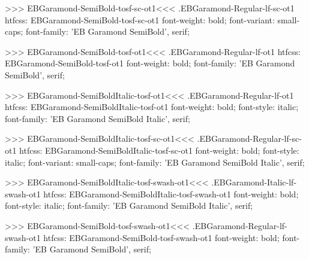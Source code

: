 {{{{{{{>>>
\<EBGaramond-SemiBold-tosf-sc-ot1\><<<
.EBGaramond-Regular-lf-sc-ot1
htfcss:  EBGaramond-SemiBold-tosf-sc-ot1  font-weight: bold; font-variant: small-caps; font-family: 'EB Garamond SemiBold', serif;

>>>
\<EBGaramond-SemiBold-tosf-ot1\><<<
.EBGaramond-Regular-lf-ot1
htfcss:  EBGaramond-SemiBold-tosf-ot1  font-weight: bold; font-family: 'EB Garamond SemiBold', serif;

>>>
\<EBGaramond-SemiBoldItalic-tosf-ot1\><<<
.EBGaramond-Regular-lf-ot1
htfcss:  EBGaramond-SemiBoldItalic-tosf-ot1  font-weight: bold; font-style: italic; font-family: 'EB Garamond SemiBold Italic', serif;

>>>
\<EBGaramond-SemiBoldItalic-tosf-sc-ot1\><<<
.EBGaramond-Regular-lf-sc-ot1
htfcss:  EBGaramond-SemiBoldItalic-tosf-sc-ot1  font-weight: bold; font-style: italic; font-variant: small-caps; font-family: 'EB Garamond SemiBold Italic', serif;

>>>
\<EBGaramond-SemiBoldItalic-tosf-swash-ot1\><<<
.EBGaramond-Italic-lf-swash-ot1
htfcss:  EBGaramond-SemiBoldItalic-tosf-swash-ot1  font-weight: bold; font-style: italic; font-family: 'EB Garamond SemiBold Italic', serif;

>>>
\<EBGaramond-SemiBold-tosf-swash-ot1\><<<
.EBGaramond-Regular-lf-swash-ot1
htfcss:  EBGaramond-SemiBold-tosf-swash-ot1  font-weight: bold; font-family: 'EB Garamond SemiBold', serif;

}}}}}}}
